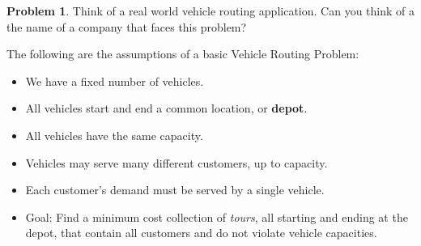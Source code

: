\documentclass[11pt]{article}
\theoremstyle{definition}
\newtheorem{problem}{Problem}
\newcommand{\answerbox}[3]{%
  \fbox{%
    \begin{minipage}[#1]{#2}
      \hfill\vspace{#3}
    \end{minipage}
  }
}
\newcommand{\answerboxfull}[2]{%
  \answerbox{#1}{6.38in}{#2} 
}
\begin{document}

\begin{problem} Think of a real world vehicle routing application.  Can you think of a the name of a company that faces this problem?\\
\answerboxfull{c}{,5in}
\end{problem}

\newpage

The following are the assumptions of a basic Vehicle Routing Problem:

\begin{itemize}
	\item We have a fixed number of vehicles.
	\item All vehicles start and end a common location, or \textbf{depot}.
	\item All vehicles have the same capacity.  
	\item Vehicles may serve many different customers, up to capacity.
	\item Each customer's demand must be served by a single vehicle.
	\item Goal:  Find a minimum cost collection of \emph{tours}, all starting and ending at the depot, that contain all customers and do not violate vehicle capacities.
\end{itemize}
\end{document}
